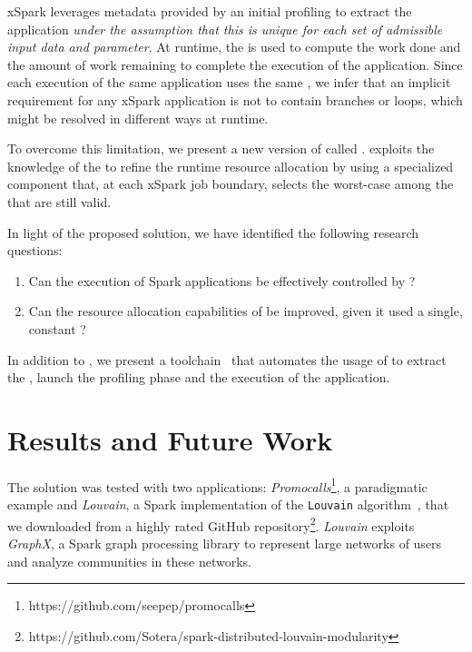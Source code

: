 xSpark leverages metadata provided by an initial profiling to  extract the application \plan \textit{under the assumption that this \plan is unique for each set of admissible input data and parameter}. At runtime, the \plan is used to compute the work done and the amount of work remaining to complete the execution of the application. Since each execution of the same application uses the same \plan, we infer that an implicit requirement for any xSpark application is not to contain branches or loops, which might be resolved in different ways at runtime.

To overcome this limitation, we present a new version of \cSpark called \tool. %
\tool exploits the knowledge of the \model to refine the runtime resource allocation by using a specialized component that, at each xSpark job boundary, selects the worst-case \plan among the \plans that are still valid.

In light of the proposed solution, we have identified the following research questions:

\begin{enumerate}[\boldmath$RQ_1 : $] 
	\item Can the execution of Spark applications be effectively controlled by \tool?
	\item Can the resource allocation capabilities of \cSpark be improved, given it used a single, constant \plan?
\end{enumerate}

In addition to \tool, we present a toolchain~\cite{misc:xSparkDagsymb} that automates the usage of  \dSymb to extract the \model, launch the profiling phase and the execution of the application. 

\section*{Results and Future Work}\label{sec:results_future_works}
The solution was tested with two applications:  \textit{Promocalls}\footnote{https://github.com/seepep/promocalls}, a paradigmatic example and \textit{Louvain}, a Spark implementation of the \texttt{Louvain} algorithm~\cite{Louvain}, that we downloaded from a highly rated GitHub repository\footnote{https://github.com/Sotera/spark-distributed-louvain-modularity}. \textit{Louvain} exploits \textit{GraphX}, a Spark graph processing library to represent large networks of users and analyze communities in these networks. 

